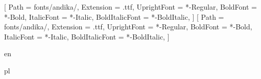 
\usepackage{fontspec}
\setmainfont{Andika}[
  Path = fonts/andika/,
  Extension = .ttf,
  UprightFont = *-Regular,
  BoldFont = *-Bold,
  ItalicFont = *-Italic,
  BoldItalicFont = *-BoldItalic,
]
\setsansfont{Andika}[
  Path = fonts/andika/,
  Extension = .ttf,
  UprightFont = *-Regular,
  BoldFont = *-Bold,
  ItalicFont = *-Italic,
  BoldItalicFont = *-BoldItalic,
]

\makeatletter
\def\aal@booklang@en{en}
\def\aal@booklang@pl{pl}
\ifx\booklang\aal@booklang@en
  \usepackage[british]{babel}
\else\ifx\booklang\aal@booklang@pl
  \usepackage[polish]{babel}
\else
  \usepackage[spanish]{babel}
\fi\fi
\makeatother

